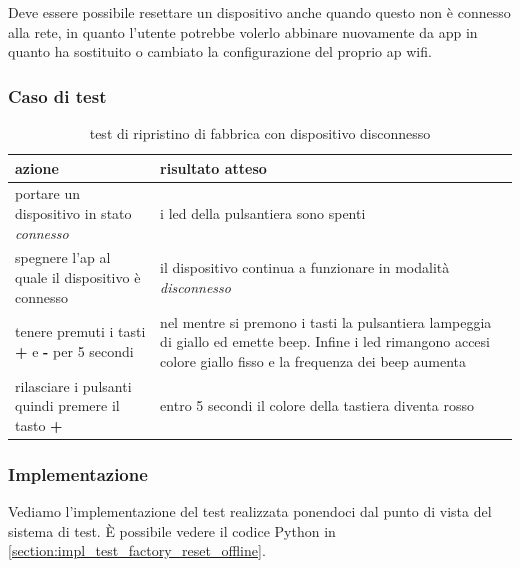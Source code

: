 \documentclass[12pt,a4paper,twoside,titlepage]{book}
\begin{document}
Deve essere possibile resettare un dispositivo anche quando questo non è connesso
alla rete, in quanto l'utente potrebbe volerlo abbinare nuovamente da app in quanto ha sostituito
o cambiato la configurazione del proprio \acrshort{ap} \Gls{wifi}.

\subsubsection{Caso di test}

\begin{table}
    \centering
    \begin{tabular}{| p{} | p{} |}
        \hline
        \textbf{azione} & \textbf{risultato atteso} \\ \hline
        portare un dispositivo in stato \textit{connesso} & i \acrshort{led} della pulsantiera sono spenti \\ \hline
        spegnere l'\acrshort{ap} al quale il dispositivo è connesso & il dispositivo continua a funzionare in modalità \textit{disconnesso} \\ \hline
        tenere premuti i tasti \textbf{+} e \textbf{-} per 5 secondi & nel mentre si premono i tasti la pulsantiera lampeggia di giallo ed emette beep. Infine i \acrshort{led} rimangono accesi colore giallo fisso e la frequenza dei beep aumenta \\ \hline
        rilasciare i pulsanti quindi premere il tasto \textbf{+} & entro 5 secondi il colore della tastiera diventa rosso \\ \hline
    \end{tabular}
    \caption{test di ripristino di fabbrica con dispositivo disconnesso}
\end{table}

\subsubsection{Implementazione}
Vediamo l'implementazione del test realizzata ponendoci dal punto di vista del sistema di test. 
È possibile vedere il codice Python in \autoref{section:impl_test_factory_reset_offline}.
\end{document}
